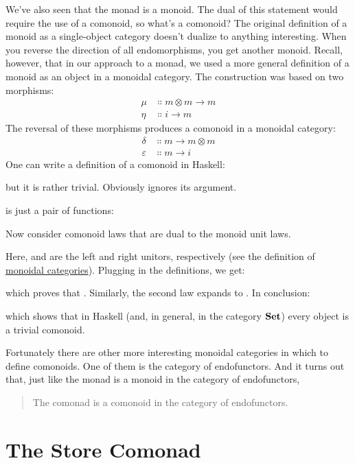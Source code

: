 We've also seen that the monad is a monoid. The dual of this statement
would require the use of a comonoid, so what's a comonoid? The original
definition of a monoid as a single-object category doesn't dualize to
anything interesting. When you reverse the direction of all
endomorphisms, you get another monoid. Recall, however, that in our
approach to a monad, we used a more general definition of a monoid as an
object in a monoidal category. The construction was based on two
morphisms:
\[
	\begin{aligned}
		\mu  & \Colon m \otimes m \to m \\
		\eta & \Colon i \to m
	\end{aligned}
\]
The reversal of these morphisms produces a comonoid in a monoidal
category:
\[
	\begin{aligned}
		\delta      & \Colon m \to m \otimes m \\
		\varepsilon & \Colon m \to i
	\end{aligned}
\]
One can write a definition of a comonoid in Haskell:

but it is rather trivial. Obviously  ignores its
argument.

 is just a pair of functions:

Now consider comonoid laws that are dual to the monoid unit laws.

Here,  and  are the left and right unitors,
respectively (see the definition of
\hyperref[monads-categorically]{monoidal
	categories}). Plugging in the definitions, we get:

which proves that . Similarly, the second law expands
to . In conclusion:

which shows that in Haskell (and, in general, in the category
$\mathbf{Set}$) every object is a trivial comonoid.

Fortunately there are other more interesting monoidal categories in
which to define comonoids. One of them is the category of endofunctors.
And it turns out that, just like the monad is a monoid in the category
of endofunctors,

\begin{quote}
	The comonad is a comonoid in the category of endofunctors.
\end{quote}

\section{The Store Comonad}

